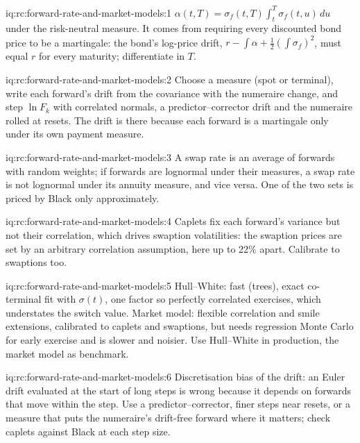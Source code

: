 \begin{solution}{iq:rc:forward-rate-and-market-models:1}
$\alpha(t,T)=\sigma_f(t,T)\int_t^T\sigma_f(t,u)\,du$ under the risk-neutral measure. It
comes from requiring every discounted bond price to be a martingale: the bond's
log-price drift, $r-\int\alpha+\frac12(\int\sigma_f)^2$, must equal $r$ for every
maturity; differentiate in $T$.
\end{solution}

\begin{solution}{iq:rc:forward-rate-and-market-models:2}
Choose a measure (spot or terminal), write each forward's drift from the
covariance with the numeraire change, and step $\ln F_k$ with correlated normals,
a predictor--corrector drift and the numeraire rolled at resets. The drift is
there because each forward is a martingale only under its own payment measure.
\end{solution}

\begin{solution}{iq:rc:forward-rate-and-market-models:3}
A swap rate is an average of forwards with random weights; if forwards are
lognormal under their measures, a swap rate is not lognormal under its annuity
measure, and vice versa. One of the two sets is priced by Black only
approximately.
\end{solution}

\begin{solution}{iq:rc:forward-rate-and-market-models:4}
Caplets fix each forward's variance but not their correlation, which drives
swaption volatilities: the swaption prices are set by an arbitrary correlation
assumption, here up to 22\% apart. Calibrate to swaptions too.
\end{solution}

\begin{solution}{iq:rc:forward-rate-and-market-models:5}
Hull--White: fast (trees), exact co-terminal fit with $\sigma(t)$, one factor so
perfectly correlated exercises, which understates the switch value. Market
model: flexible correlation and smile extensions, calibrated to caplets and
swaptions, but needs regression Monte Carlo for early exercise and is slower
and noisier. Use Hull--White in production, the market model as benchmark.
\end{solution}

\begin{solution}{iq:rc:forward-rate-and-market-models:6}
Discretisation bias of the drift: an Euler drift evaluated at the start of long
steps is wrong because it depends on forwards that move within the step. Use a
predictor--corrector, finer steps near resets, or a measure that puts the
numeraire's drift-free forward where it matters; check caplets against Black at
each step size.
\end{solution}
